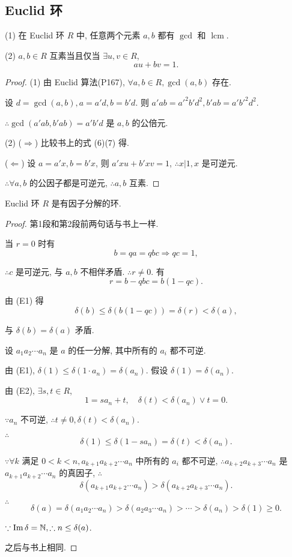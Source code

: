 \documentclass[UTF8]{ctexart}
\begin{document}
\subsection{Euclid 环}
\begin{theorem}[书上的定理3]
    (1) 在 Euclid 环 $R$ 中, 任意两个元素 $a,b$ 都有 $\gcd$ 和 $\operatorname{lcm}$.

    (2) $a,b\in R$ 互素当且仅当 $\exists u,v\in R$,
    \[au+bv=1.\]
\end{theorem}
\begin{proof}
    (1) 由 Euclid 算法(P167), $\forall a,b\in R,\gcd(a,b)$ 存在.

    设 $d=\gcd(a,b),a=a'd,b=b'd$. 则 $a'ab=a'^2b'd^2,b'ab=a'b'^2d^2$.

    $\therefore\gcd(a'ab,b'ab)=a'b'd$ 是 $a,b$ 的公倍元.

    (2) ($\Rightarrow$) 比较书上的式 (6)(7) 得.

    ($\Leftarrow$) 设 $a=a'x,b=b'x$, 则 $a'xu+b'xv=1$, $\therefore x|1,x$ 是可逆元.

    $\therefore\forall a,b$ 的公因子都是可逆元, $\therefore a,b$ 互素.
\end{proof}
\begin{theorem}[书上的引理]\label{t3.2}
    Euclid 环 $R$ 是有因子分解的环.
\end{theorem}
\begin{proof}
    第1段和第2段前两句话与书上一样.

    当 $r=0$ 时有
    \[b=qa=qbc\Rightarrow qc=1,\]

    $\therefore c$ 是可逆元, 与 $a,b$ 不相伴矛盾. $\therefore r\neq0$. 有
    \[r=b-qbc=b(1-qc).\]

    由 (E1) 得
    \[\delta(b)\leq\delta(b(1-qc))=\delta(r)<\delta(a),\]
    
    与 $\delta(b)=\delta(a)$ 矛盾.

    设 $a_1a_2\cdots a_n$ 是 $a$ 的任一分解, 其中所有的 $a_i$ 都不可逆.

    由 (E1), $\delta(1)\leq\delta(1\cdot a_n)=\delta(a_n)$. 假设 $\delta(1)=\delta(a_n)$.

    由 (E2), $\exists s,t\in R$,
    \[1=sa_n+t,\quad\delta(t)<\delta(a_n)\vee t=0.\]

    $\because a_n$ 不可逆, $\therefore t\neq0,\delta(t)<\delta(a_n)$.

    $\therefore$
    \[\delta(1)\leq\delta(1-sa_n)=\delta(t)<\delta(a_n).\]

    $\because\forall k$ 满足 $0<k<n,a_{k+1}a_{k+2}\cdots a_n$ 中所有的 $a_i$ 都不可逆, $\therefore a_{k+2}a_{k+3}\cdots a_n$ 是 $a_{k+1}a_{k+2}\cdots a_n$ 的真因子, $\therefore$
    \[\delta(a_{k+1}a_{k+2}\cdots a_n)>\delta(a_{k+2}a_{k+3}\cdots a_n).\]

    $\therefore$
    \[\delta(a)=\delta(a_1a_2\cdots a_n)>\delta(a_2a_3\cdots a_n)>\cdots>\delta(a_n)>\delta(1)\geq0.\]

    $\because\operatorname{Im} \delta=\mathbb{N},\therefore n\leq\delta(a)$.

    之后与书上相同.
\end{proof}
\end{document}
